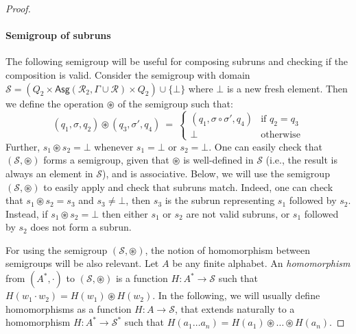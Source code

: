 \documentclass[
a4paper
]{article}
\theoremstyle{plain}
\theoremstyle{definition}
\theoremstyle{remark}
\newcommand{\Reg}{\mathcal{R}}
\newcommand{\Asg}{\operatorname{Asg}}
\renewcommand{\operatorname}[1]{\textsf{#1}}
\begin{document}
\begin{proof}
\paragraph{Semigroup of subruns} The following semigroup will be useful for composing subruns and checking if the composition is valid. Consider the semigroup with domain $\mathcal{S} = (Q_2 \times \Asg(\Reg_2, \Gamma \cup \Reg) \times Q_2) \cup \{\bot\}$ where $\bot$ is a new fresh element. Then we define the operation $\circledast$ of the semigroup such that:
\[
(q_1, \sigma, q_2) \circledast (q_3, \sigma', q_4) \ = \ \left\{ 
\begin{array}{ll}
	(q_1, \sigma \circ \sigma', q_4) & \text{if } q_2 = q_3 \\
	\bot & \text{otherwise}
\end{array}
\right.
\]
Further, $s_1 \circledast s_2 = \bot$ whenever $s_1 = \bot$ or $s_2 = \bot$.
One can easily check that $(\mathcal{S}, \circledast)$ forms a semigroup, given that $\circledast$ is well-defined in $\mathcal{S}$ (i.e., the result is always an element in $\mathcal{S}$), and is associative. 
Below, we will use the semigroup $(\mathcal{S}, \circledast)$ to easily apply and check that subruns match. Indeed, one can check that $s_1 \circledast s_2 = s_3$ and $s_3 \neq \bot$, then $s_3$ is the subrun representing $s_1$ followed by $s_2$. Instead, if $s_1 \circledast s_2 = \bot$ then either $s_1$ or $s_2$ are not valid subruns, or $s_1$ followed by $s_2$ does not form a subrun. 

For using the semigroup $(\mathcal{S}, \circledast)$, the notion of homomorphism between semigroups will be also relevant. Let $A$ be any finite alphabet. An \emph{homomorphism} from $(A^*, \cdot)$ to $(\mathcal{S}, \circledast)$ is a function $H: A^* \to \mathcal{S}$ such that $H(w_1 \cdot w_2) = H(w_1) \circledast H(w_2)$. In the following, we will usually define homomorphisms as a function $H: A \to \mathcal{S}$, that extends naturally to a homomorphism $H: A^* \to \mathcal{S}^*$ such that $H(a_1\ldots a_n) = H(a_1) \circledast \ldots \circledast H(a_n)$.


\end{proof}
\end{document}
